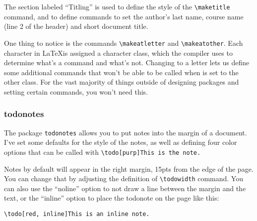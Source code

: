 \documentclass[12pt]{article}
\begin{document}
    The section labeled ``Titling'' is used to define the style of the \texttt{\textbackslash maketitle} command, and to define commands to set the author's last name, course name (line 2 of the header) and short document title. 

    One thing to notice is the commands \texttt{\textbackslash makeatletter} and \texttt{\textbackslash makeatother}. Each character in \LaTeX is assigned a character class, which the compiler uses to determine what's a command and what's not. Changing \@ to a letter lets us define some additional commands that won't be able to be called when \@ is set to the other class. For the vast majority of things outside of designing packages and setting certain commands, you won't need this. 

\subsubsection{todonotes}

    The package \texttt{todonotes} allows you to put notes into the margin of a document. I've set some defaults for the style of the notes, as well as defining four color options that can be called with \texttt{\textbackslash todo[purp]{This is the note.}} 

    Notes by default will appear in the right margin, 15pts from the edge of the page. You can change that by adjusting the definition of \texttt{\textbackslash todowidth} command. You can also use the ``noline'' option to not draw a line between the margin and the text, or the ``inline'' option to place the todonote on the page like this:

    \texttt{\textbackslash todo[red, inline]{This is an inline note.}}



\end{document}
